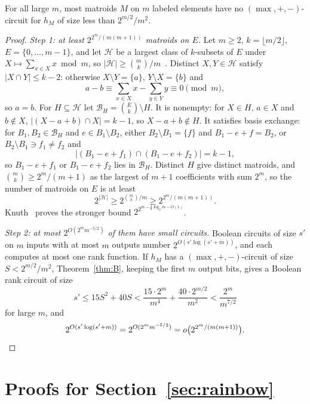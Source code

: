 \begin{corollary}
\label{cor:count}
For all large $m$, most matroids $M$ on $m$ labeled elements have no $(\max,+,-)$-circuit for $h_M$ of size less than $2^{m/2}/m^{2}$.
\end{corollary}

\begin{proof}
\emph{Step 1: at least $2^{2^{m}/(m(m+1))}$ matroids on $E$.}  Let $m\ge2$, $k=\lfloor m/2\rfloor$,
$E=\{0,\ldots,m-1\}$, and let $\mathcal H$ be a largest class of $k$-subsets of
$E$ under $X\mapsto\sum_{x\in X}x\bmod m$, so
$|\mathcal H|\ge\binom mk/m$~\cite{graham-sloane80}.  Distinct $X,Y\in\mathcal H$
satisfy $|X\cap Y|\le k-2$: otherwise $X\setminus Y=\{a\}$, $Y\setminus X=\{b\}$
and
\[
  a-b\equiv\sum_{x\in X}x-\sum_{y\in Y}y\equiv0\pmod m,
\]
so $a=b$.  For $H\subseteq\mathcal H$ let $\mathcal B_H=\binom Ek\setminus H$.  It
is nonempty: for $X\in H$, $a\in X$ and $b\notin X$, $|(X-a+b)\cap X|=k-1$, so
$X-a+b\notin H$.  It satisfies basis exchange: for
$B_1,B_2\in\mathcal B_H$ and $e\in B_1\setminus B_2$, either
$B_2\setminus B_1=\{f\}$ and $B_1-e+f=B_2$, or $B_2\setminus B_1\ni f_1\ne f_2$ and
\[
  \bigl|(B_1-e+f_1)\cap(B_1-e+f_2)\bigr|=k-1,
\]
so $B_1-e+f_1$ or $B_1-e+f_2$ lies in $\mathcal B_H$.  Distinct $H$ give distinct
matroids, and $\binom mk\ge2^{m}/(m+1)$ as the largest of $m+1$ coefficients with
sum $2^{m}$, so the number of matroids on $E$ is at least
\[
  2^{|\mathcal H|}\ge2^{\binom mk/m}\ge2^{2^{m}/(m(m+1))}.
\]
Knuth~\cite{knuth74} proves the stronger bound $2^{2^{m-\frac32\log_2m-O(1)}}$.

\emph{Step 2: at most $2^{O(2^{m}m^{-5/2})}$ of them have small circuits.}  Boolean circuits of size $s'$ on $m$ inputs
with at most $m$ outputs number $2^{O(s'\log(s'+m))}$, and each computes at most
one rank function.  If $h_M$ has a $(\max,+,-)$-circuit of size
$S<2^{m/2}/m^{2}$, Theorem~\ref{thm:B}, keeping the first $m$ output bits, gives a
Boolean rank circuit of size
\[
  s'\le15S^{2}+40S<\frac{15\cdot2^{m}}{m^{4}}+\frac{40\cdot2^{m/2}}{m^{2}}<\frac{2^{m}}{m^{7/2}}
\]
for large $m$, and
\[
  2^{O(s'\log(s'+m))}=2^{O(2^{m}m^{-5/2})}=o\bigl(2^{2^{m}/(m(m+1))}\bigr).\qedhere
\]
\end{proof}

\section{Proofs for Section~\texorpdfstring{\ref{sec:rainbow}}{4}}
\label{app:rainbow}

